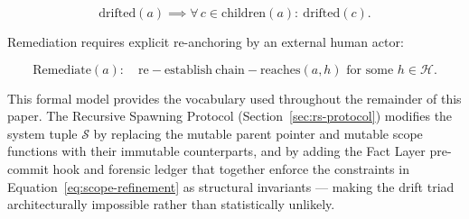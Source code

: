 \begin{equation}
\mathrm{drifted}(a) \implies \forall\, c \in \mathrm{children}(a):\ \mathrm{drifted}(c).
\label{eq:drift-propagation}
\end{equation}

Remediation requires explicit re-anchoring by an external human actor:

\begin{equation}
\mathrm{Remediate}(a):\quad \mathrm{re-establish}\ \mathrm{chain-reaches}(a, h) \text{ for some } h \in \mathcal{H}.
\label{eq:drift-remediation}
\end{equation}

\medskip
This formal model provides the vocabulary used throughout the remainder of this paper. The Recursive Spawning Protocol (Section~\ref{sec:rs-protocol}) modifies the system tuple $\mathcal{S}$ by replacing the mutable parent pointer and mutable scope functions with their immutable counterparts, and by adding the Fact Layer pre-commit hook and forensic ledger that together enforce the constraints in Equation~\ref{eq:scope-refinement} as structural invariants — making the drift triad architecturally impossible rather than statistically unlikely.

